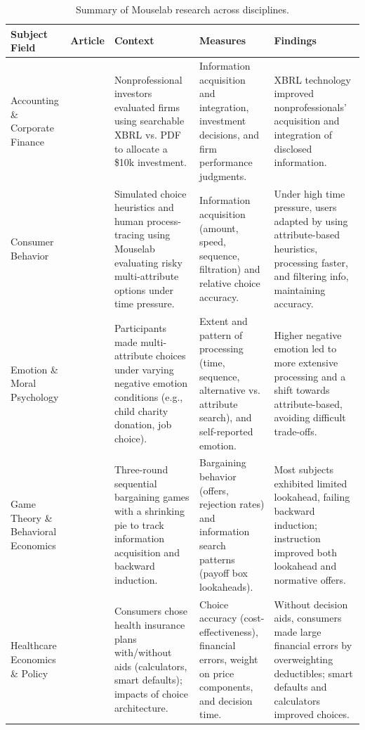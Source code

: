 
\begin{table}[hbtp]
\centering
\caption{Summary of Mouselab research across disciplines.}
\small
\begin{tabularx}{\textwidth}{@{}p{2.5cm} p{2cm} X X X@{}}
\toprule
\textbf{Subject Field} & \textbf{Article} & \textbf{Context} & \textbf{Measures} & \textbf{Findings} \\
\midrule
Accounting \& Corporate Finance & \citet{hodge2004does} & Nonprofessional investors evaluated firms using searchable XBRL vs. PDF to allocate a \$10k investment. & Information acquisition and integration, investment decisions, and firm performance judgments. & XBRL technology improved nonprofessionals' acquisition and integration of disclosed information. \\
\addlinespace
Consumer Behavior & \citet{payne1988adaptive} & Simulated choice heuristics and human process-tracing using Mouselab evaluating risky multi-attribute options under time pressure. & Information acquisition (amount, speed, sequence, filtration) and relative choice accuracy. & Under high time pressure, users adapted by using attribute-based heuristics, processing faster, and filtering info, maintaining accuracy. \\
\addlinespace
Emotion \& Moral Psychology & \citet{luce1997choice} & Participants made multi-attribute choices under varying negative emotion conditions (e.g., child charity donation, job choice). & Extent and pattern of processing (time, sequence, alternative vs. attribute search), and self-reported emotion. & Higher negative emotion led to more extensive processing and a shift towards attribute-based, avoiding difficult trade-offs. \\
\addlinespace
Game Theory \& Behavioral Economics & \citet{johnson2002detecting} & Three-round sequential bargaining games with a shrinking pie to track information acquisition and backward induction. & Bargaining behavior (offers, rejection rates) and information search patterns (payoff box lookaheads). & Most subjects exhibited limited lookahead, failing backward induction; instruction improved both lookahead and normative offers. \\
\addlinespace
Healthcare Economics \& Policy & \citet{johnson2013can} \newline \citet{dellaert2024choice} & Consumers chose health insurance plans with/without aids (calculators, smart defaults); impacts of choice architecture. & Choice accuracy (cost-effectiveness), financial errors, weight on price components, and decision time. & Without decision aids, consumers made large financial errors by overweighting deductibles; smart defaults and calculators improved choices. \\

\end{tabularx}
\end{table}
